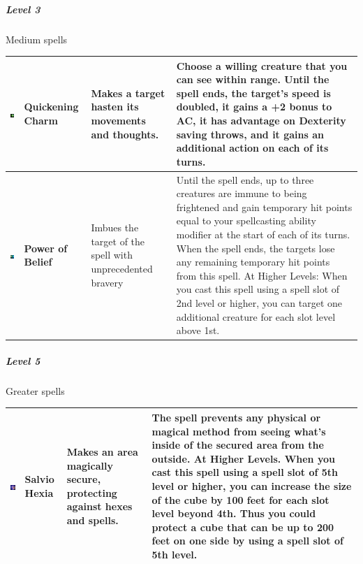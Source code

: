 \subparagraph{Level 3} 
Medium spells \\
\begin{tabular}{ m{2cm}m{3cm}m{4cm}m{6cm} } \hline
	\includegraphics[width=2cm]{../Pictures/Gameplay/Spells/Icon/Haste_spell_icon.png} & \textbf{Quickening Charm} & Makes a target hasten its movements and thoughts. & Choose a willing creature that you can see within range. Until the spell ends, the target's speed is doubled, it gains a +2 bonus to AC, it has advantage on Dexterity saving throws, and it gains an additional action on each of its turns. \\ \hline
   \includegraphics[width=2cm]{../Pictures/Gameplay/Spells/Icon/Heroism_spell_icon.png} & \textbf{Power of Belief } & Imbues the target of the spell with unprecedented bravery & Until the spell ends, up to three creatures are immune to being frightened and gain temporary hit points equal to your spellcasting ability modifier at the start of each of its turns. When the spell ends, the targets lose any remaining temporary hit points from this spell. At Higher Levels: When you cast this spell using a spell slot of 2nd level or higher, you can target one additional creature for each slot level above 1st. \\  \hline
\end{tabular}

\subparagraph{Level 5} 
Greater spells \\
\begin{tabular}{ m{2cm}m{3cm}m{4cm}m{6cm} } \hline
	\includegraphics[width=2cm]{../Pictures/Gameplay/Spells/Icon/Salvio_Hexia_spell_icon.png} & \textbf{Salvio Hexia} & Makes an area magically secure, protecting against hexes and spells. &  The spell prevents any physical or magical method from seeing what's inside of the secured area from the outside. At Higher Levels. When you cast this spell using a spell slot of 5th level or higher, you can increase the size of the cube by 100 feet for each slot level beyond 4th. Thus you could protect a cube that can be up to 200 feet on one side by using a spell slot of 5th level.\\ \hline
\end{tabular}

